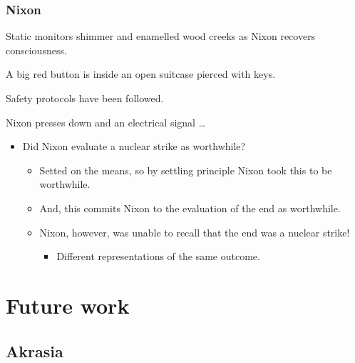\documentclass[noamssymb, compress, handout]{beamer} %
\newcommand{\hozlinedash}[0]{%
  \noindent\hdashrule[0.5ex][c]{\textwidth}{.1pt}{2.5pt}
}
\begin{document}
 \begin{frame}
  \frametitle{Nixon}

  {\rmfamily
    Static monitors shimmer and enamelled wood creeks as Nixon recovers consciousness.

    A big red button is inside an open suitcase pierced with keys.

    Safety protocols have been followed.

    Nixon presses down and an electrical signal \dots
  }

  \pause
  \hozlinedash

  \begin{itemize}
  \item<+-> Did Nixon evaluate a nuclear strike as worthwhile?
    \begin{itemize}
    \item<+-> Setted on the means, so by settling principle Nixon took this to be worthwhile.
    \item<+-> And, this commits Nixon to the evaluation of the end as worthwhile.
    \item<+-> Nixon, however, was unable to recall that the end was a nuclear strike!
      \begin{itemize}
      \item<+-> Different representations of the same outcome.
      \end{itemize}
    \end{itemize}
  \end{itemize}
\end{frame}



\section{Future work}
\label{sec:future-work}


\subsection{Akrasia}
\label{sec:akrasia}
\end{document}
